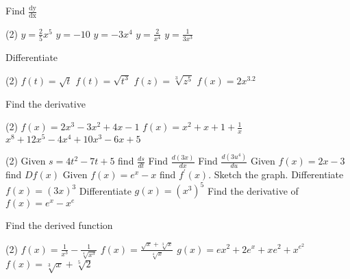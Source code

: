 \begin{Exercise}[title={Standard Derivatives},label=exStandardDerivatives]
	\Question Find $\frac{\text{dy}}{\text{dx}}$
	\begin{tasks}(2)
		\task $y =\frac{2}{5} x^{5}$ %
		\task $y = -10$ %
		\task $y = -3 x^{4}$ %
		\task $y =\frac{2}{x^{4}}$ %
		\task $y =\frac{1}{3 x^{3}}$ %
	\end{tasks}
	
	\Question Differentiate
	\begin{tasks}(2)
		\task $f (t) =\sqrt{t}$ %
		\task $f (t) =\sqrt{t^{3}}$ %
		\task $f (z) =\sqrt[{3}]{z^{5}}$ %
		\task $f (x) =2 x^{3.2}$ %
	\end{tasks}

	\Question Find the derivative
\begin{tasks}(2)
	\task $f (x) =2 x^{3} -3 x^{2} +4 x -1$ %
	\task $f (x) =x^{2} +x +1 +\frac{1}{x}$ %
	\task $x^{8} +12 x^{5} -4 x^{4} +10 x^{3} -6 x +5$%
\end{tasks}

\Question 
\begin{tasks}(2)
	\task Given $s =4 t^{2} -7 t +5$ find $\frac{d s}{d t}$ %
	\task Find $\frac{d \left (3 x\right )}{d x}$  %
	\task Find $\frac{d \left (3 u^{4}\right )}{d u}$ %
	\task Given $f (x) =2 x -3$ find $D f (x)$ %
	\task Given $f (x) =e^{x} -x$ find $f^{ \prime } (x)$. Sketch the graph. %
	\task Differentiate $f (x) =\left (3 x\right )^{3}$ %
	\task Differentiate $g (x) =\left (x^{3}\right )^{5}$ %
	\task Find the derivative of $f (x) =e^{x} -x^{e}$ %
\end{tasks}

	\Question Find the derived function
\begin{tasks}(2)
	\task $f (x) =\frac{1}{x^{3}} -\frac{1}{\sqrt[{4}]{x^{3}}}$ %
	\task $f (x) =\frac{\sqrt{x} +\sqrt[{3}]{x}}{\sqrt[{4}]{x}}$ %
	\task $g (x) =e x^{2} +2 e^{x} +x e^{2} +x^{e^{2}}$ %
	\task $f (x) =\sqrt[{3}]{x} +\sqrt[{5}]{2}$ %
\end{tasks}


\end{Exercise}

